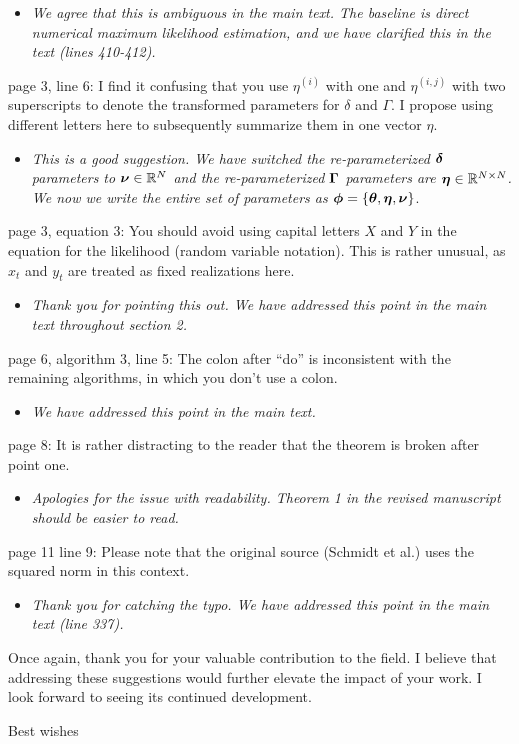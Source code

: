 \documentclass[11pt]{article}
\begin{document}
\begin{itemize}
    \item \textit{We agree that this is ambiguous in the main text. The baseline is direct numerical maximum likelihood estimation, and we have clarified this in the text (lines 410-412).}
\end{itemize}

page 3, line 6: I find it confusing that you use $\eta^{(i)}$ with one and $\eta^{(i,j)}$ with two superscripts to denote the transformed parameters for $\delta$ and $\Gamma$. I propose using different letters here to subsequently summarize them in one vector $\eta$.

\begin{itemize}
    \item \textit{This is a good suggestion. We have switched the re-parameterized $\boldsymbol{\delta}$ parameters to $\boldsymbol{\nu} \in \mathbb{R}^N$ and the re-parameterized $\boldsymbol{\Gamma}$ parameters are $\boldsymbol{\eta} \in \mathbb{R}^{N \times N}$. We now we write the entire set of parameters as $\boldsymbol{\phi} = \{\boldsymbol{\theta},\boldsymbol{\eta},\boldsymbol{\nu}\}$}.    
\end{itemize}

page 3, equation 3: You should avoid using capital letters $X$ and $Y$ in the equation for the likelihood (random variable notation). This is rather unusual, as $x_t$ and $y_t$ are treated as fixed realizations here.

\begin{itemize}
    \item \textit{Thank you for pointing this out. We have addressed this point in the main text throughout section 2.}
\end{itemize}

page 6, algorithm 3, line 5: The colon after “do” is inconsistent with the remaining algorithms, in which you don’t use a colon.

\begin{itemize}
    \item \textit{We have addressed this point in the main text.}
\end{itemize}

page 8: It is rather distracting to the reader that the theorem is broken after point one.

\begin{itemize}
    \item \textit{Apologies for the issue with readability. Theorem 1 in the revised manuscript should be easier to read.}
\end{itemize}

page 11 line 9: Please note that the original source (Schmidt et al.) uses the squared norm in this context.

\begin{itemize}
    \item \textit{Thank you for catching the typo. We have addressed this point in the main text (line 337).}  
\end{itemize}

Once again, thank you for your valuable contribution to the field. I believe that addressing these suggestions would further elevate the impact of your work. I look forward to seeing its continued development.

Best wishes
\end{document}
